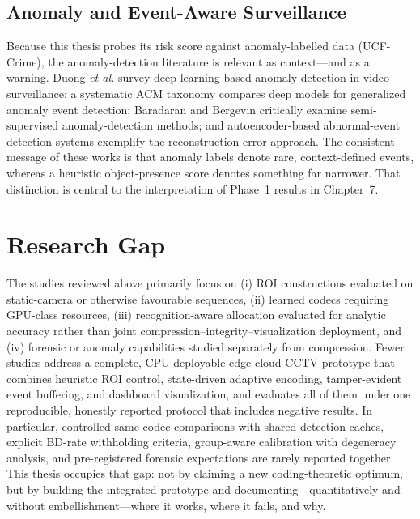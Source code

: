 \subsection{Anomaly and Event-Aware Surveillance}

Because this thesis probes its risk score against anomaly-labelled data (UCF-Crime), the anomaly-detection literature is relevant as context---and as a warning. Duong \textit{et al.} \cite{Duong2023Survey} survey deep-learning-based anomaly detection in video surveillance; a systematic ACM taxonomy \cite{ACMTaxonomy2024} compares deep models for generalized anomaly event detection; Baradaran and Bergevin \cite{Baradaran2021Anomaly} critically examine semi-supervised anomaly-detection methods; and autoencoder-based abnormal-event detection systems \cite{Autoencoder2024Event} exemplify the reconstruction-error approach. The consistent message of these works is that anomaly labels denote rare, context-defined events, whereas a heuristic object-presence score denotes something far narrower. That distinction is central to the interpretation of Phase~1 results in Chapter~7.

\section{Research Gap}

The studies reviewed above primarily focus on (i) ROI constructions evaluated on static-camera or otherwise favourable sequences, (ii) learned codecs requiring GPU-class resources, (iii) recognition-aware allocation evaluated for analytic accuracy rather than joint compression--integrity--visualization deployment, and (iv) forensic or anomaly capabilities studied separately from compression. Fewer studies address a complete, CPU-deployable edge-cloud CCTV prototype that combines heuristic ROI control, state-driven adaptive encoding, tamper-evident event buffering, and dashboard visualization, and evaluates all of them under one reproducible, honestly reported protocol that includes negative results. In particular, controlled same-codec comparisons with shared detection caches, explicit BD-rate withholding criteria, group-aware calibration with degeneracy analysis, and pre-registered forensic expectations are rarely reported together. This thesis occupies that gap: not by claiming a new coding-theoretic optimum, but by building the integrated prototype and documenting---quantitatively and without embellishment---where it works, where it fails, and why.

